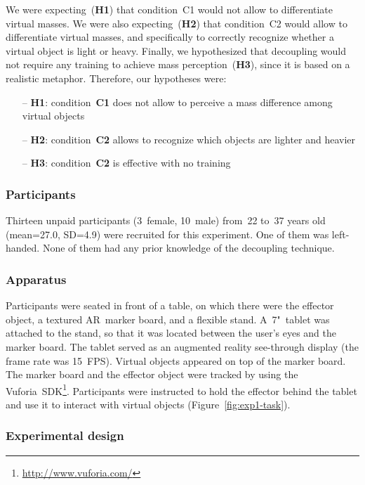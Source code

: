 \documentclass{vgtc}
\begin{document}
\noindent
We were expecting~(\textbf{H1}) that condition~C1 would not allow to differentiate virtual masses. We were also expecting~(\textbf{H2}) that condition~C2 would allow to differentiate virtual masses, and specifically to correctly recognize whether a virtual object is light or heavy. Finally, we hypothesized that decoupling would not require any training to achieve mass perception~(\textbf{H3}), since it is based on a realistic metaphor. Therefore, our hypotheses were:
\begin{itemize}
\item[--] \textbf{H1}: condition~\textbf{C1} does not allow to perceive a mass difference among virtual objects
\item[--] \textbf{H2}: condition~\textbf{C2} allows to recognize which objects are lighter and heavier
\item[--] \textbf{H3}: condition~\textbf{C2} is effective with no training
\end{itemize}

\subsubsection{Participants}

Thirteen unpaid participants (3~female, 10~male) from~22 to~37 years old (mean=27.0, SD=4.9) were recruited for this experiment. One of them was left-handed. None of them had any prior knowledge of the decoupling technique.

\subsubsection{Apparatus}

Participants were seated in front of a table, on which there were the effector object, a textured AR~marker board, and a flexible stand. A~7"~tablet was attached to the stand, so that it was located between the user's eyes and the marker board. The tablet served as an augmented reality see-through display (the frame rate was 15~FPS). Virtual objects appeared on top of the marker board. The marker board and the effector object were tracked by using the Vuforia~SDK\footnote{\url{http://www.vuforia.com/}}. Participants were instructed to hold the effector behind the tablet and use it to interact with virtual objects (Figure~\ref{fig:exp1-task}).

\subsubsection{Experimental design}
\label{sec:exp1-protocol}
\end{document}
